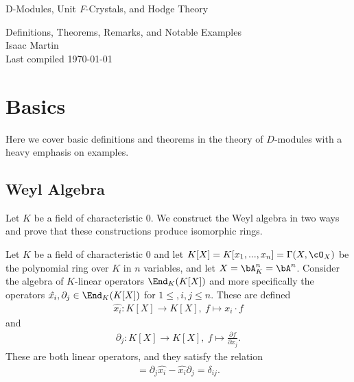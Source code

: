 


\begin{center}
	\Large
	\begin{LARGE}
		D-Modules, Unit \textit{F}-Crystals, and Hodge Theory \\
	\end{LARGE}
	Definitions, Theorems, Remarks, and Notable Examples \\
	Isaac Martin \\
    Last compiled \today
\end{center}
\normalsize
\vspace{-2mm}
\hru

\tableofcontents
\newpage
\section{Basics}
Here we cover basic definitions and theorems in the theory of $D$-modules with a heavy emphasis on examples.

\subsection{Weyl Algebra}
Let $K$ be a field of characteristic $0$. We construct the Weyl algebra in two ways and prove that these constructions produce isomorphic rings.

\begin{defn}\label{defn:Weyl-algebra-construction-1}
	Let $K$ be a field of characteristic $0$ and let $K[X] = K[x_1,...,x_n] = \Gamma(X,\cO_X)$ be the polynomial ring over $K$ in $n$ variables, and let $X = \bA^n_K = \bA^n$. Consider the algebra of $K$-linear operators $\End_K(K[X])$ and more specifically the operators $\hat{x_i}, \partial_j \in \End_K(K[X])$ for $1\leq, i,j \leq n$. These are defined
	\begin{align*}
		\hat{x_i}: K[X]\to K[X], ~ f \mapsto x_i \cdot f
	\end{align*}
	and 
	\begin{align*}
		\partial_j:K[X]\to K[X], ~ f\mapsto \frac{\partial f}{\partial x_j}.
	\end{align*}
	These are both linear operators, and they satisfy the relation
	\begin{align*}
		[\partial_j, \hat{x_i}] = \partial_j \hat{x_i} - \hat{x_i}\partial_j = \delta_{ij}.
	\end{align*}
\end{defn}


